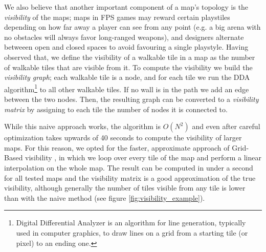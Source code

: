 \documentclass{Configuration_Files/PoliMi3i_thesis}
\begin{document}
We also believe that another important component of a map's topology is the \textit{visibility} of the maps; maps in FPS games may reward certain playstiles depending on how far away a player can see from any point (e.g. a big arena with no obstacles will always favor long-ranged weapons), and designers alternate betweeen open and closed spaces to avoid favouring a single playstyle. Having observed that, we define the visibility of a walkable tile in a map as the number of walkable tiles that are visible from it. To compute the visibility we build the \textit{visibility graph}; each walkable tile is a node, and for each tile we run the DDA algorithm\footnote{Digital Differential Analyzer is an algorithm for line generation, typically used in computer graphics, to draw lines on a grid from a starting tile (or pixel) to an ending one.} to all other walkable tiles. If no wall is in the path we add an edge between the two nodes. Then, the resulting graph can be converted to a \textit{visibility matrix} by assigning to each tile the number of nodes it is connected to.

While this naive approach works, the algorithm is $O\left(N^{2}\right)$ and even after careful optimization takes upwards of 40 seconds to compute the visibility of larger maps. For this reason, we opted for the faster, approximate approach of Grid-Based visibility \cite{goldstein_quick_2023}, in which we loop over every tile of the map and perform a linear interpolation on the whole map. The result can be computed in under a second for all tested maps and the visibility matrix is a good approximation of the true visibility, although generally the number of tiles visible from any tile is lower than with the naive method (see figure \ref{fig:visibility_example}).
\end{document}
